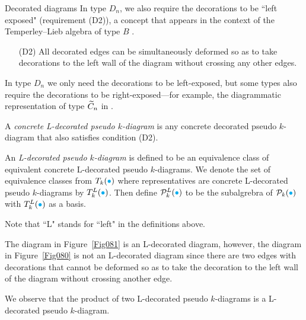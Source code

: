 \begin{section}{Decorated diagrams}
In type $D_n$, we also require the decorations to be ``left exposed" (requirement (D2)), a concept that appears in the context of the Temperley--Lieb algebra of type $B$ \cite{Green1998a}.

\begin{enumerate}[leftmargin=0.6in]
\item[(D2)]  All decorated edges can be simultaneously deformed so as to take decorations to the left wall of the diagram without crossing any other edges.
\end{enumerate}

\begin{remark}
In type $D_n$ we only need the decorations to be left-exposed, but some types also require the decorations to be right-exposed---for example, the diagrammatic representation of type $\widetilde{C}_n$ in \cite{Ernst2012}.
\end{remark}

\begin{definition}
\rm A \emph{concrete L-decorated pseudo $k$-diagram} is any concrete decorated pseudo $k$-diagram that also satisfies condition (D2).
\end{definition}

\begin{definition}\label{def:T_{k}^{LR}(Omega)}
\rm An \emph{L-decorated pseudo $k$-diagram} is defined to be an equivalence class of equivalent concrete L-decorated pseudo $k$-diagrams.  We denote the set of equivalence classes from $T_{k}({\color{cyan}\bullet})$ where representatives are concrete L-decorated pseudo $k$-diagrams by $T_{k}^L({\color{cyan}\bullet})$. Then define $\mathcal{P}_{k}^L({\color{cyan}\bullet})$ to be the subalgrebra of $\mathcal{P}_{k}({\color{cyan}\bullet})$ with $T_{k}^L({\color{cyan}\bullet})$ as a basis.  
\end{definition}

Note that ``L" stands for ``left" in the definitions above.
\begin{example}
The diagram in Figure~\ref{Fig081} is an L-decorated diagram, however, the diagram in Figure~\ref{Fig080} is not an L-decorated diagram since there are two edges with decorations that cannot be deformed so as to take the decoration to the left wall of the diagram without crossing another edge.
\end{example}
\begin{remark}
We observe that the product of two L-decorated pseudo $k$-diagrams is a L-decorated pseudo $k$-diagram.
\end{remark}






\end{section}
